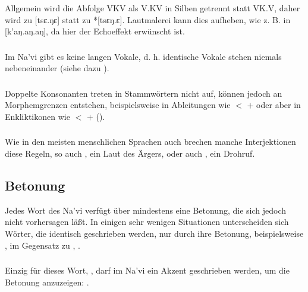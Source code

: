 \subsubsection{} Allgemein wird die Abfolge VKV als V.KV in Silben getrennt
statt VK.V, daher wird  zu [tsɛ.ŋɛ] statt zu *[tsɛŋ.ɛ].
Lautmalerei kann dies aufheben, wie z. B. in  [k'aŋ.aŋ.aŋ],
da hier der Echoeffekt erwünscht ist.

\subsubsection{} Im Na’vi gibt es keine langen Vokale, d. h. identische
Vokale stehen niemals nebeneinander (siehe dazu ).

\subsubsection{} Doppelte Konsonanten treten in Stammw\"ortern nicht auf,
k\"onnen jedoch an Morphemgrenzen entstehen, beispielsweise in Ableitungen wie
 $<$  $+$  oder aber in Enkliktikonen wie
 $<$  $+$  ().

\subsubsection{} Wie in den meisten menschlichen Sprachen auch brechen
manche Interjektionen diese Regeln, so auch , ein Laut des \"Argers,
oder auch , ein Drohruf.


\subsection{Betonung}
Jedes Wort des Na’vi verf\"ugt \"uber mindestens eine Betonung, die sich
jedoch nicht vorhersagen l\"a\ss{}t. In einigen sehr wenigen Situationen
unterscheiden sich W\"orter, die identisch geschrieben werden, nur durch
ihre Betonung, beispielsweise ,  im Gegensatz zu
, .

\subsubsection{} Einzig f\"ur dieses Wort, , darf im Na’vi ein
Akzent geschrieben werden, um die Betonung anzuzeigen: .

